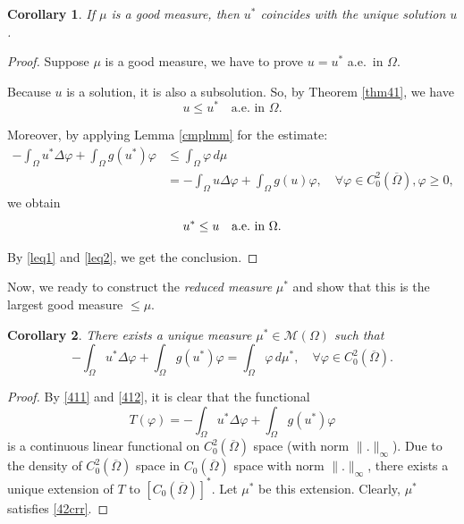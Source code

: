 \documentclass[a4paper, 11pt]{report}
\newtheorem{crr}{Corollary}[chapter]
\theoremstyle{definition}\newtheorem*{rmk}{Remark}
\begin{document}
\begin{crr}
If $\mu$ is a good measure, then $u^*$ coincides with the unique solution $u$.
\end{crr}
\begin{proof}
Suppose $\mu$ is a good measure, we have to prove $u = u^*$ a.e.\ in $\Omega$.

Because $u$ is a solution, it is also a subsolution. So, by Theorem \ref{thm41}, we have
\begin{equation}\label{leq1}
u \le u^*\quad \text{a.e.\ in }\Omega.
\end{equation}

Moreover, by applying Lemma \ref{cmplmm} for the estimate:
\begin{align*}
-\int_{\Omega}u^*\Delta\varphi + \int_{\Omega}g(u^*)\varphi &\le \int_{\Omega}\varphi\, d\mu \\
&= -\int_{\Omega}u\Delta\varphi + \int_{\Omega}g(u)\varphi, \quad\forall \varphi\in C^2_0(\overline{\Omega}),\varphi\ge 0,
\end{align*}
we obtain
\begin{equation}\label{leq2}
u^* \le u \quad \text{a.e.\ in } \Omega.\qedhere
\end{equation}

By \eqref{leq1} and \eqref{leq2}, we get the conclusion.
\end{proof}

Now, we ready to construct the \emph{reduced measure} $\mu^*$ and show that this is the largest good measure $\le \mu$.

\begin{crr}
There exists a unique measure $\mu^*\in \mathcal{M}(\Omega)$ such that
\begin{equation}\label{42crr}
-\int_{\Omega}u^*\Delta\varphi + \int_{\Omega}g(u^*)\varphi = \int_{\Omega} \varphi \,d\mu^*, \quad \forall \varphi \in C_0^2(\overline{\Omega}).
\end{equation}
\end{crr}

\begin{proof}
By \eqref{411} and \eqref{412}, it is clear that the functional
\[
T(\varphi) = -\int_{\Omega}u^*\Delta\varphi + \int_{\Omega}g(u^*)\varphi
\]
is a continuous linear functional on $C^2_0(\overline{\Omega})$ space (with norm $\| .\|_{\infty}$). Due to the density of $C^2_0(\overline{\Omega})$ space in $C_0(\overline{\Omega})$ space with norm $\| .\|_{\infty}$, there exists a unique extension of $T$ to $[C_0(\overline{\Omega})]^*$. Let $\mu^*$ be this extension. Clearly, $\mu^*$ satisfies \eqref{42crr}.
\end{proof}
\end{document}
